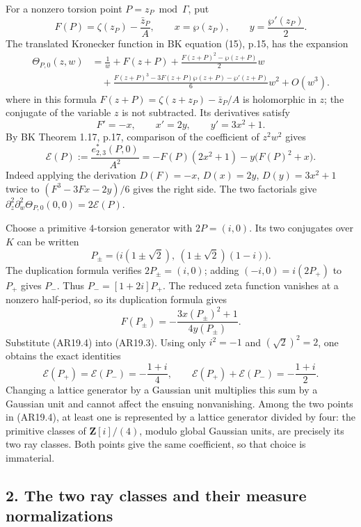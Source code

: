 \documentclass[11pt,a4paper]{article}
\begin{document}
For a nonzero torsion point \(P=z_P\bmod\Gamma\), put \[
F(P)=\zeta(z_P)-\frac{\bar z_P}{A},\qquad
x=\wp(z_P),\qquad y=\frac{\wp'(z_P)}2.
\] The translated Kronecker function in BK equation (15), p.15, has the
expansion \[
\begin{aligned}
\Theta_{P,0}(z,w)&=\frac1w+F(z+P)
 +\frac{F(z+P)^2-\wp(z+P)}2w\\
&\quad +\frac{F(z+P)^3-3F(z+P)\wp(z+P)-\wp'(z+P)}6w^2+O(w^3).
\end{aligned}
\] where in this formula \(F(z+P)=\zeta(z+z_P)-\bar z_P/A\) is
holomorphic in \(z\); the conjugate of the variable \(z\) is not
subtracted. Its derivatives satisfy \[
F'=-x,\qquad x'=2y,\qquad y'=3x^2+1.
\] By BK Theorem 1.17, p.17, comparison of the coefficient of \(z^2w^2\)
gives \[
\mathcal E(P):=\frac{e^*_{2,3}(P,0)}{A^2}
 =-F(P)(2x^2+1)-y\bigl(F(P)^2+x\bigr).
\tag{AR19.3}
\] Indeed applying the derivation \(D(F)=-x\), \(D(x)=2y\),
\(D(y)=3x^2+1\) twice to \((F^3-3Fx-2y)/6\) gives the right side. The
two factorials give
\(\partial_z^2\partial_w^2\Theta_{P,0}(0,0)=2\mathcal E(P)\).

Choose a primitive \(4\)-torsion generator with \(2P=(i,0)\). Its two
conjugates over \(K\) can be written \[
P_\pm=\bigl(i(1\pm\sqrt2),\ (1\pm\sqrt2)(1-i)\bigr).
\tag{AR19.4}
\] The duplication formula verifies \(2P_\pm=(i,0)\); adding
\((-i,0)=i(2P_+)\) to \(P_+\) gives \(P_-\). Thus \(P_-=[1+2i]P_+\). The
reduced zeta function vanishes at a nonzero half-period, so its
duplication formula gives \[
F(P_\pm)=-\frac{3x(P_\pm)^2+1}{4y(P_\pm)}.
\] Substitute (AR19.4) into (AR19.3). Using only \(i^2=-1\) and
\((\sqrt2)^2=2\), one obtains the exact identities \[
\mathcal E(P_+)=\mathcal E(P_-)=-\frac{1+i}{4},
\qquad
\mathcal E(P_+)+\mathcal E(P_-)=-\frac{1+i}{2}.
\tag{AR19.5}
\] Changing a lattice generator by a Gaussian unit multiplies this sum
by a Gaussian unit and cannot affect the ensuing nonvanishing. Among the
two points in (AR19.4), at least one is represented by a lattice
generator divided by four: the primitive classes of
\(\mathbf Z[i]/(4)\), modulo global Gaussian units, are precisely its
two ray classes. Both points give the same coefficient, so that choice
is immaterial.

\subsection{2. The two ray classes and their measure
normalizations}\label{the-two-ray-classes-and-their-measure-normalizations}
\end{document}
